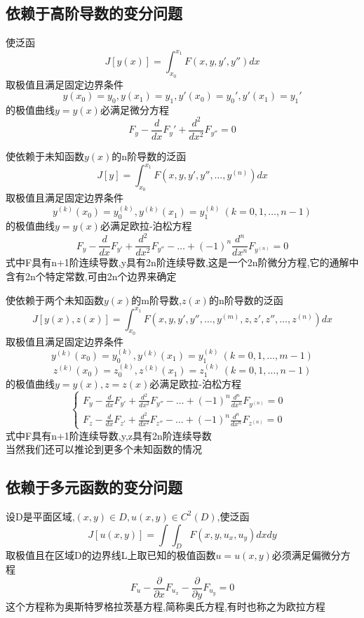 \documentclass{book}
\begin{document}
\subsection{依赖于高阶导数的变分问题}
\begin{theorem}
使泛函
$$J[y(x)]=\int_{x_0}^{x_1}F(x,y,y',y'')dx$$
取极值且满足固定边界条件
$$
y(x_0)=y_0,y(x_1)=y_1,y'(x_0)=y_0',y'(x_1)=y_1'
$$
的极值曲线$y=y(x)$必满足微分方程
$$F_y - \frac{d}{dx}F_y' + \frac{d^2}{dx^2}F_{y''} = 0 $$
\end{theorem}

\begin{corollary}
使依赖于未知函数$y(x)$的n阶导数的泛函
$$J[y]=\int_{x_0}^{x_1}F(x,y,y',y'', \ldots , y^{(n)})dx$$
取极值且满足固定边界条件
$$
y^{(k)}(x_0)=y_0^{(k)}, y^{(k)}(x_1)=y_1^{(k)} ~ (k= 0,1,\ldots , n-1)
$$
的极值曲线$y=y(x)$必满足欧拉-泊松方程
$$F_y - \frac{d}{dx}F_{y'} + \frac{d^2}{dx^2}F_{y''} - \dots + (-1)^{n}\frac{d^n}{dx^n}F_{y^{(n)}}=0  $$
式中F具有n+1阶连续导数,y具有2n阶连续导数,这是一个2n阶微分方程,它的通解中含有2n个特定常数,可由2n个边界来确定
\end{corollary}

\begin{corollary}
使依赖于两个未知函数$y(x)$的m阶导数,$z(x)$的n阶导数的泛函
$$J[y(x),z(x)]=\int_{x_0}^{x_1}F(x,y,y',y'', \ldots , y^{(m)},z,z',z'', \ldots , z^{(n)})dx$$
取极值且满足固定边界条件
$$
y^{(k)}(x_0)=y_0^{(k)}, y^{(k)}(x_1)=y_1^{(k)} ~ (k= 0,1,\ldots , m-1)
$$
$$
z^{(k)}(x_0)=z_0^{(k)}, z^{(k)}(x_1)=z_1^{(k)} ~ (k= 0,1,\ldots , n-1)
$$
的极值曲线$y=y(x),z=z(x)$必满足欧拉-泊松方程
$$
\left\{
  \begin{array}{ll}
    F_y - \frac{d}{dx}F_{y'} + \frac{d^2}{dx^2}F_{y''} - \dots + (-1)^{n}\frac{d^n}{dx^n}F_{y^{(n)}}=0 &\\
    F_z - \frac{d}{dx}F_{z'} + \frac{d^2}{dx^2}F_{z''} - \dots + (-1)^{n}\frac{d^n}{dx^n}F_{z^{(n)}}=0   &
  \end{array}
\right.
$$
式中F具有n+1阶连续导数,y,z具有2n阶连续导数
\\
当然我们还可以推论到更多个未知函数的情况
\end{corollary}

\subsection{依赖于多元函数的变分问题}
\begin{theorem}
设D是平面区域,$(x,y) \in D ,u(x,y) \in C^2(D)$,使泛函
$$
J[u(x,y)]=\int\int_{D}F(x,y,u_x,u_y)dxdy
$$
取极值且在区域D的边界线L上取已知的极值函数$u=u(x,y)$必须满足偏微分方程
$$
F_u -\frac{\partial}{\partial x}F_{u_x}-\frac{\partial}{\partial y}F_{u_y} = 0
$$
这个方程称为奥斯特罗格拉茨基方程,简称奥氏方程,有时也称之为欧拉方程
\end{theorem}
\end{document}
